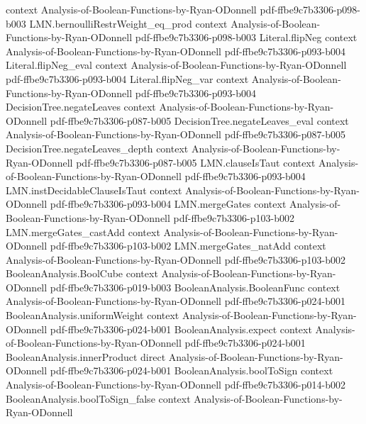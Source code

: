 \begin{theorem}
  {context}
  {Analysis-of-Boolean-Functions-by-Ryan-ODonnell}
  {pdf-ffbe9c7b3306-p098-b003}
\proofstep
  {LMN.bernoulliRestrWeight_eq_prod}
  {context}
  {Analysis-of-Boolean-Functions-by-Ryan-ODonnell}
  {pdf-ffbe9c7b3306-p098-b003}
\proofstep
  {Literal.flipNeg}
  {context}
  {Analysis-of-Boolean-Functions-by-Ryan-ODonnell}
  {pdf-ffbe9c7b3306-p093-b004}
\proofstep
  {Literal.flipNeg_eval}
  {context}
  {Analysis-of-Boolean-Functions-by-Ryan-ODonnell}
  {pdf-ffbe9c7b3306-p093-b004}
\proofstep
  {Literal.flipNeg_var}
  {context}
  {Analysis-of-Boolean-Functions-by-Ryan-ODonnell}
  {pdf-ffbe9c7b3306-p093-b004}
\proofstep
  {DecisionTree.negateLeaves}
  {context}
  {Analysis-of-Boolean-Functions-by-Ryan-ODonnell}
  {pdf-ffbe9c7b3306-p087-b005}
\proofstep
  {DecisionTree.negateLeaves_eval}
  {context}
  {Analysis-of-Boolean-Functions-by-Ryan-ODonnell}
  {pdf-ffbe9c7b3306-p087-b005}
\proofstep
  {DecisionTree.negateLeaves_depth}
  {context}
  {Analysis-of-Boolean-Functions-by-Ryan-ODonnell}
  {pdf-ffbe9c7b3306-p087-b005}
\proofstep
  {LMN.clauseIsTaut}
  {context}
  {Analysis-of-Boolean-Functions-by-Ryan-ODonnell}
  {pdf-ffbe9c7b3306-p093-b004}
\proofstep
  {LMN.instDecidableClauseIsTaut}
  {context}
  {Analysis-of-Boolean-Functions-by-Ryan-ODonnell}
  {pdf-ffbe9c7b3306-p093-b004}
\proofstep
  {LMN.mergeGates}
  {context}
  {Analysis-of-Boolean-Functions-by-Ryan-ODonnell}
  {pdf-ffbe9c7b3306-p103-b002}
\proofstep
  {LMN.mergeGates_castAdd}
  {context}
  {Analysis-of-Boolean-Functions-by-Ryan-ODonnell}
  {pdf-ffbe9c7b3306-p103-b002}
\proofstep
  {LMN.mergeGates_natAdd}
  {context}
  {Analysis-of-Boolean-Functions-by-Ryan-ODonnell}
  {pdf-ffbe9c7b3306-p103-b002}
\proofstep
  {BooleanAnalysis.BoolCube}
  {context}
  {Analysis-of-Boolean-Functions-by-Ryan-ODonnell}
  {pdf-ffbe9c7b3306-p019-b003}
\proofstep
  {BooleanAnalysis.BooleanFunc}
  {context}
  {Analysis-of-Boolean-Functions-by-Ryan-ODonnell}
  {pdf-ffbe9c7b3306-p024-b001}
\proofstep
  {BooleanAnalysis.uniformWeight}
  {context}
  {Analysis-of-Boolean-Functions-by-Ryan-ODonnell}
  {pdf-ffbe9c7b3306-p024-b001}
\proofstep
  {BooleanAnalysis.expect}
  {context}
  {Analysis-of-Boolean-Functions-by-Ryan-ODonnell}
  {pdf-ffbe9c7b3306-p024-b001}
\proofstep
  {BooleanAnalysis.innerProduct}
  {direct}
  {Analysis-of-Boolean-Functions-by-Ryan-ODonnell}
  {pdf-ffbe9c7b3306-p024-b001}
\proofstep
  {BooleanAnalysis.boolToSign}
  {context}
  {Analysis-of-Boolean-Functions-by-Ryan-ODonnell}
  {pdf-ffbe9c7b3306-p014-b002}
\proofstep
  {BooleanAnalysis.boolToSign_false}
  {context}
  {Analysis-of-Boolean-Functions-by-Ryan-ODonnell}

\end{theorem}
